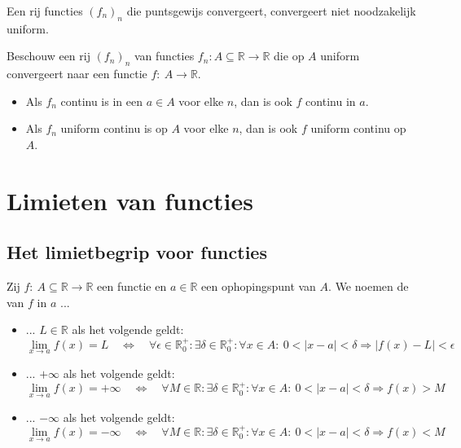 \documentclass[main.tex]{subfiles}
\begin{document}
\begin{tvb}
  Een rij functies $(f_{n})_{n}$ die puntsgewijs convergeert, convergeert niet noodzakelijk uniform.
\end{tvb}

\begin{st}
  Beschouw een rij $(f_{n})_{n}$ van functies $f_{n}: A \subseteq \mathbb{R} \rightarrow \mathbb{R}$ die op $A$ uniform convergeert naar een functie $f:\ A \rightarrow \mathbb{R}$.
  \begin{itemize}
  \item Als $f_{n}$ continu is in een $a\in A$ voor elke $n$, dan is ook $f$ continu in $a$.
  \item Als $f_{n}$ uniform continu is op $A$ voor elke $n$, dan is ook $f$ uniform continu op $A$. 
  \end{itemize}

\end{st}

\section{Limieten van functies}
\label{sec:limi-van-funct}

\subsection{Het limietbegrip voor functies}

\begin{de}
  Zij $f:\ A \subseteq \mathbb{R} \rightarrow \mathbb{R}$ een functie en $a\in \mathbb{R}$ een ophopingspunt van $A$.
  We noemen de  van $f$ in $a$ ...
  \begin{itemize}
  \item ... $L\in \mathbb{R}$ als het volgende geldt:
    \[
    \lim_{x\rightarrow a}f(x) = L \quad\Leftrightarrow\quad
    \forall \epsilon \in \mathbb{R}_{0}^{+}: \exists \delta \in \mathbb{R}_{0}^{+}: \forall x\in A:\ 0 < |x-a| < \delta \Rightarrow |f(x) - L| < \epsilon
    \]
  \item ... $+\infty$ als het volgende geldt:
    \[
    \lim_{x\rightarrow a}f(x) = +\infty\quad\Leftrightarrow\quad
    \forall M \in \mathbb{R}: \exists \delta \in \mathbb{R}_{0}^{+}: \forall x\in A:\ 0 < |x-a| < \delta \Rightarrow f(x) > M
    \]
  \item ... $-\infty$ als het volgende geldt:
    \[
    \lim_{x\rightarrow a}f(x) = -\infty\quad\Leftrightarrow\quad
    \forall M \in \mathbb{R}: \exists \delta \in \mathbb{R}_{0}^{+}: \forall x\in A:\ 0 < |x-a| < \delta \Rightarrow f(x) < M
    \]
  \end{itemize}
\end{de}
\end{document}
